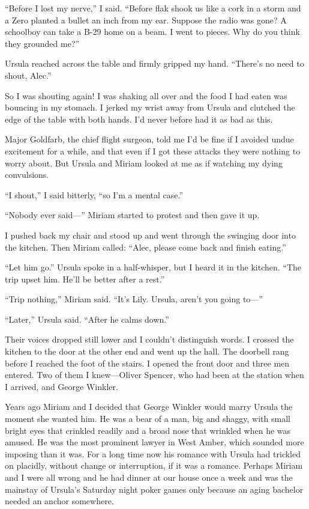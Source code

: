 \documentclass{novel}
\begin{document}
“Before I lost my nerve,” I said. “Before flak shook us like a cork in a storm and a Zero planted a bullet an inch from my ear. Suppose the radio was gone? A schoolboy can take a B-29 home on a beam. I went to pieces. Why do you think they grounded me?”

\scenestars

Ursula reached across the table and firmly gripped my hand. “There’s no need to shout, Alec.”

So I was shouting again! I was shaking all over and the food I had eaten was bouncing in my stomach. I jerked my wrist away from Ursula and clutched the edge of the table with both hands. I’d never before had it as bad as this.

Major Goldfarb, the chief flight surgeon, told me I’d be fine if I avoided undue excitement for a while, and that even if I got these attacks they were nothing to worry about. But Ursula and Miriam looked at me as if watching my dying convulsions.

“I shout,” I said bitterly, “so I’m a mental case.”

“Nobody ever said—” Miriam started to protest and then gave it up.

I pushed back my chair and stood up and went through the swinging door into the kitchen. Then Miriam called: “Alec, please come back and finish eating.”

“Let him go.” Ursula spoke in a half-whisper, but I heard it in the kitchen. “The trip upset him. He’ll be better after a rest.”

“Trip nothing,” Miriam said. “It’s Lily. Ursula, aren’t you going to—”

“Later,” Ursula said. “After he calms down.”

Their voices dropped still lower and I couldn’t distinguish words. I crossed the kitchen to the door at the other end and went up the hall. The doorbell rang before I reached the foot of the stairs. I opened the front door and three men entered. Two of them I knew—Oliver Spencer, who had been at the station when I arrived, and George Winkler.

Years ago Miriam and I decided that George Winkler would marry Ursula the moment she wanted him. He was a bear of a man, big and shaggy, with small bright eyes that crinkled readily and a broad nose that wrinkled when he was amused. He was the most prominent lawyer in West Amber, which sounded more imposing than it was. For a long time now his romance with Ursula had trickled on placidly, without change or interruption, if it was a romance. Perhaps Miriam and I were all wrong and he had dinner at our house once a week and was the mainstay of Ursula’s Saturday night poker games only because an aging bachelor needed an anchor somewhere.
\end{document}
